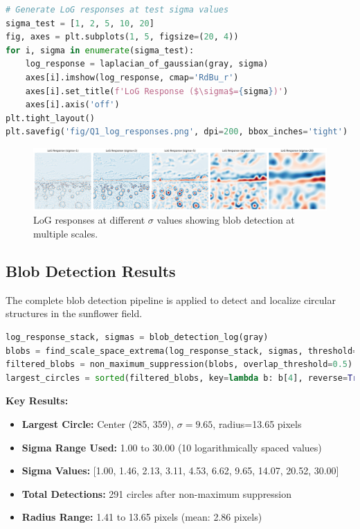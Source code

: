 \documentclass[10pt,a4paper,twocolumn]{article}
\begin{document}
\vspace{1pt}
\begin{lstlisting}[language=Python, style=mystyle]
# Generate LoG responses at test sigma values
sigma_test = [1, 2, 5, 10, 20]
fig, axes = plt.subplots(1, 5, figsize=(20, 4))
for i, sigma in enumerate(sigma_test):
    log_response = laplacian_of_gaussian(gray, sigma)
    axes[i].imshow(log_response, cmap='RdBu_r')
    axes[i].set_title(f'LoG Response ($\sigma$={sigma})')
    axes[i].axis('off')
plt.tight_layout()
plt.savefig('fig/Q1_log_responses.png', dpi=200, bbox_inches='tight')
\end{lstlisting}

\begin{figure}[H]
\centering
\includegraphics[width=0.95\columnwidth]{fig/Q1_log_responses.png}
\caption{LoG responses at different $\sigma$ values showing blob detection at multiple scales.}
\label{fig:q1_log}
\end{figure}


\subsection*{Blob Detection Results}
The complete blob detection pipeline is applied to detect and localize circular structures in the sunflower field.

\vspace{2pt}
\begin{lstlisting}[language=Python, style=mystyle]
log_response_stack, sigmas = blob_detection_log(gray)
blobs = find_scale_space_extrema(log_response_stack, sigmas, threshold=99)
filtered_blobs = non_maximum_suppression(blobs, overlap_threshold=0.5)
largest_circles = sorted(filtered_blobs, key=lambda b: b[4], reverse=True)[:10]
\end{lstlisting}

\vspace{1pt}
    \textbf{Key Results:}
\begin{itemize}
    \item \textbf{Largest Circle:} Center (285, 359), $\sigma=9.65$, radius=13.65 pixels
    \item \textbf{Sigma Range Used:} 1.00 to 30.00 (10 logarithmically spaced values)
    \item \textbf{Sigma Values:} [1.00, 1.46, 2.13, 3.11, 4.53, 6.62, 9.65, 14.07, 20.52, 30.00]
    \item \textbf{Total Detections:} 291 circles after non-maximum suppression
    \item \textbf{Radius Range:} 1.41 to 13.65 pixels (mean: 2.86 pixels)
\end{itemize}
\end{document}
